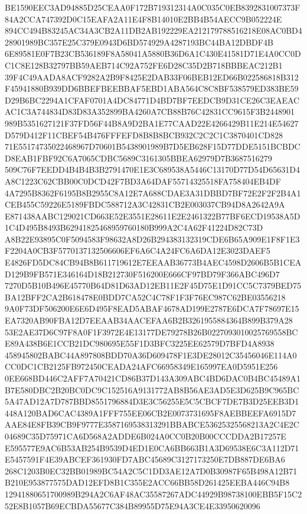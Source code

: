 \documentclass[UTF8,fontset=fandol,zihao=-4,a4paper]{ctexart}
\begin{document}
{{BE1590EEC3AD94885D25CEAA0F172B719312314A0C035C0EB8392831007373F84A2CCA747392D0C15EAFA2A11E4F8B14010E2BB4B54AECC9B052224E
894CC494B83245AC34A3CB2A11DB2AB192229EA212179788516218E08AC0BD428901989BC357E25C379E0943D6BD574929A4287193BC44BA12DBDF4B
6E89581E0F7B23CB536189F8A58041A5880B36D6A1C430E41581D71E4A0CC0DC1C8E128B32797BB59AEB714C92A752FE6D28C35D2B718BBBEAC212B1
39F4C49AADA8ACF9282A2B9F8425E2DAB33F06BEB12ED66B022586818B312F45941880B939DD6BBEFBEEBBAF5EBD1ABA564C8C8BF538579ED383BE59
D29B6BC2294A1CFAF0701A4DC84771D4BD7BF7EEDCB9D31CE26C3EAEACAC1C3A744834D83D83A352899BA4260A7CB88B76C42831CC9615F3B2448901
989B5351627121F37FD56F44B8A9D2BA1E77CAAD22E4266429B11E214E54627D579D412F11CBEF54B476FFFEFD8B8B8BCB932C2C2C1C3870401CD828
71E55174735022468967D70601B5438901989B7D5EB628F15D77DDE5151BCBDCD8EAB1FBF92C6A7065CDBC5689C3161305BBEA62979D7B3687516279
509C76F7EEDD4B4B4B3B2791470E1E3C689538A5446C13170D77D54D65631D4A8C1223C62CBB00C0DCD42F7BD3A64DAF55714325518FA758404EB4DF
4A7295B8362F6195B8B2955C8A12E7A688CDAE3A31DBBD7BF72E2F2F2B4A1CEB455C59226E5189FBDC588712A3C42831CB2E003037CB94D8A2642A9A
E871438AABC129021CD663E52E3551E28611E2E2461322B77BF6ECD19538A5D1C4D495B8493B62941825468959760180B999A2C4A62F41224D82C73D
A8B22E93895C0F5094583F98632A8D26B294383132319CDE6B65A909E1F8F1E3F2204A0CB3F5770137132506606EF6A6C4A24FC6A6DA12E3023DAEF5
E4826FD5DC84CB94B8B611719612E7EEAAB36773B4AEC4598D2606B5B1CEAD129B9FB571E346164D18B212730F516200E666CF97BD79F366ABC496D7
7270D5B10B496E45770B64D81D63AD12EB11E2F45D75E1D91CC5C7379BED75BA12BFF2CA2B618478E0BDD7CA52C4C78F1F3F76EC987C62BE03556218
9A0F73DF506200E6E6D495F8EAD5ABAF4678AD199E2787E6DCA7F78697E15EA7320AB90FBA12D7EEAAB34AACEFAA6B2B3261955884364B899B379A28
53E2AE37D6C97F8A0F1F3972E4E13177DE79278B26B0227093010025769558BCE89A438B6E1CCB21DC980695E55F1D3BFC3225EE62579D7BFD4A8938
458945802BABC44A897808BDD70A36D609478F1E3DE28012C35456046E114A0CC0DC1CB2125FB972450CEADA24AFC66958349E165997EA0D5951E256
0EE668BD446C2AFF7A70421CD86B37D143A309ABC4BD6DAC0B4BC45489A1B7E580DBC2B20BC0DC9C152516A9131772AB8B56AE3AD5E3D625B9C965BC
5A47AD12A7D787BBD8551796884D3E3C56255E5C5CBCF7DE7B3D25EEB3D1448A120BAD6CAC4389A1FFF755EE06CB2E0073731695F8AEBBEEFA6915D7
AAE84E8FB39CB9F9777E3587169538313291BBABCE53625325568213A2C4E2C04689C35D75971CA6D568A2ADDE6B024A0CC0B20B00CCCDDA2B17257E
E595577E9AC6B53AB254B9539D4ED1E0CA6BB663B1A3D69538E6C3A112D71E5457591F4E39ABCEF361930FD7ABC45689C3127173250E7DB887DE6BA6
268C1203B0EC32BB01989BC54A2C5C1DD3AE12A7D0B30987F65B498A12B71B210E953877575DAD12EFD8B1C355E2ACC66BB58D261425EEBA446C94B8
12941880651700989B294A2C6AF48AC35587267ADC44929B98738100EBB5F15C252E8B1057B69ECBDA55677C384B89955D75E94A3CE4E33950620096
}}
\end{document}
